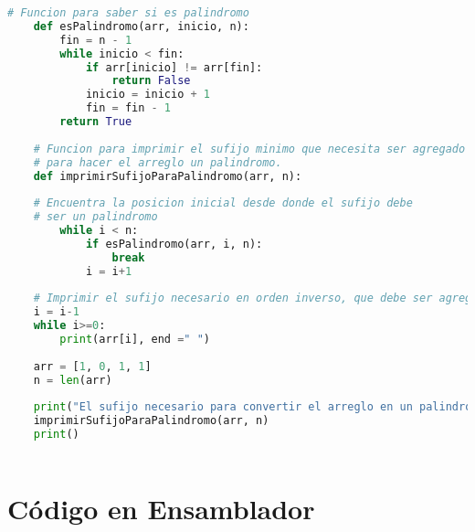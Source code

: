 \documentclass{article}
\begin{document}
	\begin{lstlisting}[language=Python, caption=Función  en Python]
	# Funcion para saber si es palindromo
	def esPalindromo(arr, inicio, n):
		fin = n - 1
		while inicio < fin:
			if arr[inicio] != arr[fin]:
				return False
			inicio = inicio + 1
			fin = fin - 1
		return True
	
	# Funcion para imprimir el sufijo minimo que necesita ser agregado al inicio 
	# para hacer el arreglo un palindromo.
	def imprimirSufijoParaPalindromo(arr, n):
	
	# Encuentra la posicion inicial desde donde el sufijo debe
	# ser un palindromo
		while i < n:
			if esPalindromo(arr, i, n):
				break
			i = i+1
	
	# Imprimir el sufijo necesario en orden inverso, que debe ser agregado al inicio
	i = i-1
	while i>=0:
		print(arr[i], end =" ")
	
	arr = [1, 0, 1, 1]
	n = len(arr)
	
	print("El sufijo necesario para convertir el arreglo en un palindromo es:", end=" ")
	imprimirSufijoParaPalindromo(arr, n)
	print()
		
	\end{lstlisting}
	
	\section{Código en Ensamblador}
	
\end{document}

